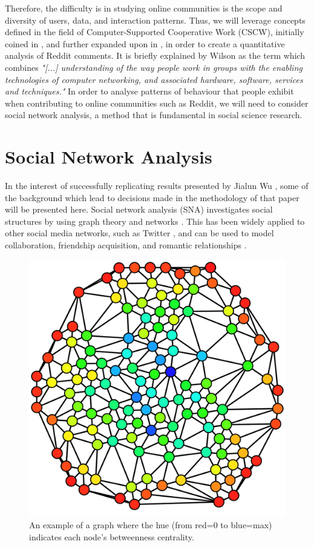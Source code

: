 \documentclass[bsc,frontabs,twoside,singlespacing,parskip,deptreport]{infthesis}
\begin{document}
Therefore, the difficulty is in studying online communities is the scope and diversity of users, data, and interaction patterns. Thus, we will leverage concepts defined in the field of Computer-Supported Cooperative Work (CSCW), initially coined in \cite{1988Ccw:}, and further expanded upon in \cite{WilsonPaul1991CSCW}, in order to create a quantitative analysis of Reddit comments. It is briefly explained by Wilson as the term which combines \textit{"[...] understanding of the way people work in groups with the enabling technologies of computer networking, and associated hardware, software, services and techniques."} In order to analyse patterns of behaviour that people exhibit when contributing to online communities such as Reddit, we will need to consider social network analysis, a method that is fundamental in social science research.

\section{Social Network Analysis}\label{sna}
In the interest of successfully replicating results presented by Jialun Wu \cite{masters}, some of the background which lead to decisions made in the methodology of that paper will be presented here. Social network analysis (SNA) investigates social structures by using graph theory and networks \cite{OtteEvelien2002Snaa}. This has been widely applied to other social media networks, such as Twitter \cite{GrandjeanMartin2016Asna}, and can be used to model collaboration, friendship acquisition, and romantic relationships \cite{abraham2009computational}.

\begin{figure}[htb]\label{graph}
	\centering
 	\includegraphics[width=.6\textwidth]{graph.png}
  	\caption{An example of a graph where the hue (from red=0 to blue=max) indicates each node's betweenness centrality. \cite{fig:graph}}
\end{figure}
\end{document}
